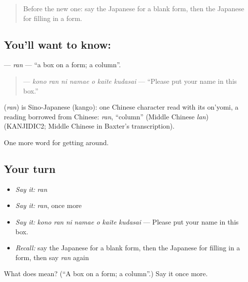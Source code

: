 \begin{quote}
Before the new one: say the Japanese for a blank form, then the Japanese for filling in a form.
\end{quote}

\subsection*{You'll want to know: }
\textbf{} — \emph{ran} — \textquotedblleft{}a box on a form; a column\textquotedblright{}.

\begin{quote}
\textbf{    } — \emph{kono ran ni namae o kaite kudasai} — \textquotedblleft{}Please put your name in this box.\textquotedblright{}
\end{quote}

\begin{cousinweb}
\textbf{} (\emph{ran}) is Sino-Japanese (kango): one Chinese character read with its on'yomi, a reading borrowed from Chinese: \emph{ran}, \textquotedblleft{}column\textquotedblright{} (Middle Chinese \emph{lan}) (KANJIDIC2; Middle Chinese in Baxter's transcription).
\end{cousinweb}

\begin{grammarlens}[title={What you've built}]
One more word for getting around.
\end{grammarlens}

\subsection*{Your turn}
\begin{itemize}
\raggedright
  \item \emph{Say it:} \emph{ran}
  \item \emph{Say it:} \emph{ran}, once more
  \item \emph{Say it:} \emph{kono ran ni namae o kaite kudasai} — Please put your name in this box.
  \item \emph{Recall:} say the Japanese for a blank form, then the Japanese for filling in a form, then say \emph{ran} again
\end{itemize}

\begin{tcolorbox}[breakable,colback=teal!4,colframe=teal!35!black,title={Before you move on}]
What does  mean? (\textquotedblleft{}A box on a form; a column\textquotedblright{}.) Say it once more.
\end{tcolorbox}
